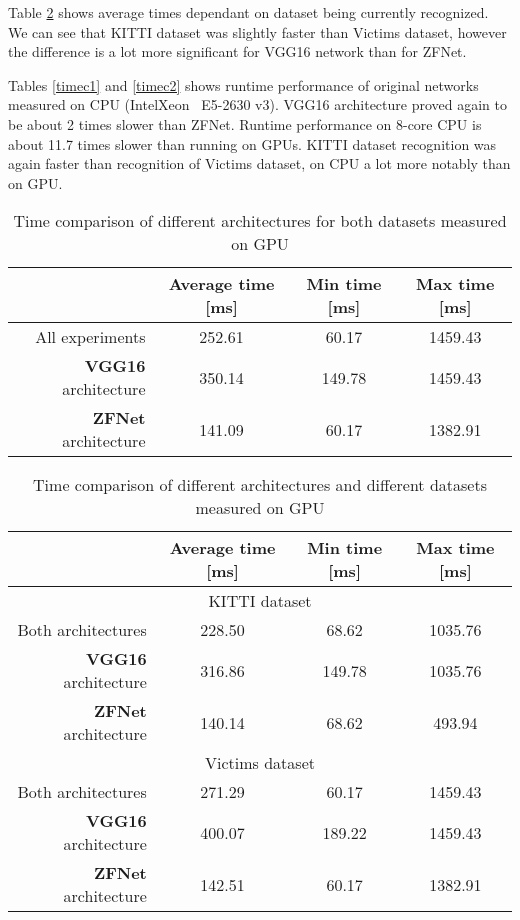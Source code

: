 Table \ref{timedd} shows average times dependant on dataset being currently recognized. We can see that KITTI dataset was slightly faster than Victims dataset, however the difference is a lot more significant for VGG16 network than for ZFNet.

Tables \ref{timec1} and \ref{timec2} shows runtime performance of original networks measured on CPU (Intel\circledR{ }Xeon\circledR~{ }E5-2630 v3). VGG16 architecture proved again to be about 2 times slower than ZFNet. Runtime performance on 8-core CPU is about 11.7 times slower than running on GPUs. KITTI dataset recognition was again faster than recognition of Victims dataset, on CPU a lot more notably than on GPU.

\begin{table}[!h]
\begin{tabular}{r|ccc}
 & Average time [ms] & Min time [ms] & Max time [ms] \\
\hline
All experiments & 252.61 & 60.17 & 1459.43 \\
\textbf{VGG16} architecture & 350.14 & 149.78 & 1459.43 \\
\textbf{ZFNet} architecture & 141.09 & 60.17 & 1382.91
\end{tabular}
\caption{Time comparison of different architectures for both datasets measured on GPU}
\label{timebd}
\end{table}

\begin{table}[!h]
\begin{tabular}{r|ccc}
 & Average time [ms] & Min time [ms] & Max time [ms] \\
\hline
\multicolumn{4}{c}{KITTI dataset} \\ \hline
Both architectures & 228.50 & 68.62 & 1035.76 \\
\textbf{VGG16} architecture & 316.86 & 149.78 & 1035.76 \\
\textbf{ZFNet} architecture & 140.14 & 68.62 & 493.94 \\
\hline
\multicolumn{4}{c}{Victims dataset} \\ \hline
Both architectures & 271.29 & 60.17 & 1459.43 \\
\textbf{VGG16} architecture & 400.07 & 189.22 & 1459.43 \\
\textbf{ZFNet} architecture & 142.51 & 60.17 & 1382.91 \\
\end{tabular}
\caption{Time comparison of different architectures and different datasets measured on GPU}
\label{timedd}
\end{table}

